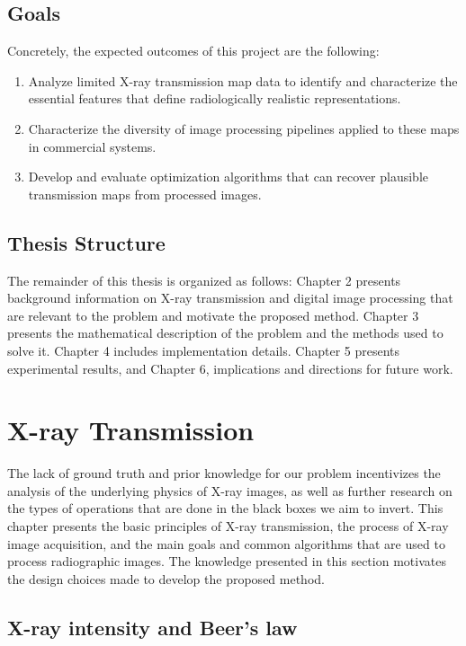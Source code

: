 \documentclass[nomenclature, english, bibtex]{kththesis}
\numberwithin{listing}{chapter}
\begin{document}
\section{Goals}

Concretely, the expected outcomes of this project are the following:

\begin{enumerate}
    \item Analyze limited X-ray transmission map data to identify and characterize the essential features that define
    radiologically realistic representations.
    \item Characterize the diversity of image processing pipelines applied to these maps in commercial systems.
    \item Develop and evaluate optimization algorithms that can recover plausible transmission maps from processed images.
\end{enumerate}

\section{Thesis Structure}

The remainder of this thesis is organized as follows: Chapter 2 presents background information on X-ray transmission and
digital image processing that are relevant to the problem and motivate the proposed method. Chapter 3
presents the mathematical description of the problem and the methods used to solve it. Chapter 4 includes implementation
details. Chapter 5 presents experimental results, and Chapter 6, implications
and directions for future work.

\chapter{X-ray Transmission}
\label{sec:xrayTransmissionModel}

The lack of ground truth and prior knowledge for our problem incentivizes the analysis of the underlying
physics of X-ray images, as well as further research on the types of operations that are done in the black boxes
we aim to invert. This chapter presents the basic principles of X-ray transmission, the process of X-ray image
acquisition, and the main goals and common algorithms that are used to process radiographic images. The
knowledge presented in this section motivates the design choices made to develop the proposed method.

\section{X-ray intensity and Beer's law}
\end{document}
